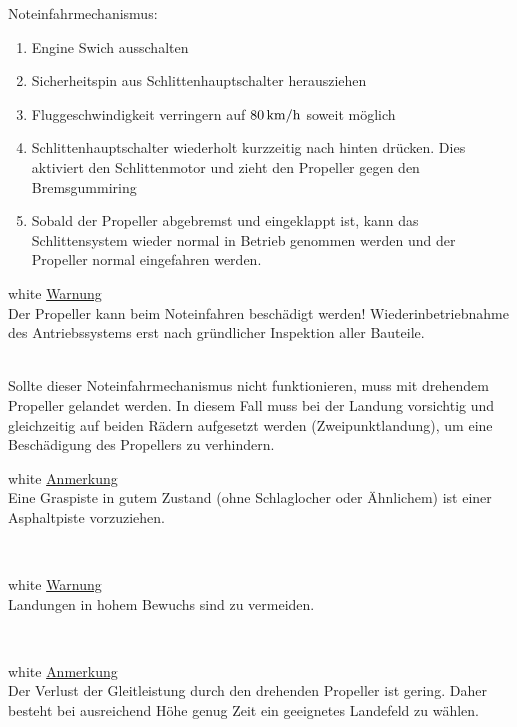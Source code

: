Noteinfahrmechanismus:
\begin{enumerate}
\item Engine Swich ausschalten
\item Sicherheitspin aus Schlittenhauptschalter herausziehen
\item Fluggeschwindigkeit verringern auf $\unit[80]{km/h}$ soweit möglich
\item Schlittenhauptschalter wiederholt kurzzeitig nach hinten drücken. Dies aktiviert den Schlittenmotor und zieht den Propeller gegen den Bremsgummiring
\item Sobald der Propeller abgebremst und eingeklappt ist, kann das Schlittensystem wieder normal in Betrieb genommen werden und der Propeller normal eingefahren werden.
\end{enumerate}

\begin{color}{white}
\large{\underline{Warnung}}\\
Der Propeller kann beim Noteinfahren beschädigt werden! Wiederinbetriebnahme des Antriebssystems erst nach gründlicher Inspektion aller Bauteile.
\end{color}\\

Sollte dieser Noteinfahrmechanismus nicht funktionieren, muss mit drehendem Propeller gelandet werden. In diesem Fall muss bei der Landung vorsichtig und gleichzeitig auf beiden Rädern aufgesetzt werden (Zweipunktlandung), um eine Beschädigung des Propellers zu verhindern.\\

\begin{color}{white}
\large{\underline{Anmerkung}}\\
Eine Graspiste in gutem Zustand (ohne Schlaglocher oder Ähnlichem) ist einer Asphaltpiste vorzuziehen.
\end{color}\\

\begin{color}{white}
\large{\underline{Warnung}}\\
Landungen in hohem Bewuchs sind zu vermeiden.
\end{color}\\

\begin{color}{white}
\large{\underline{Anmerkung}}\\
Der Verlust der Gleitleistung durch den drehenden Propeller ist gering. Daher besteht bei ausreichend Höhe genug Zeit ein geeignetes Landefeld zu wählen.
\end{color}\\

